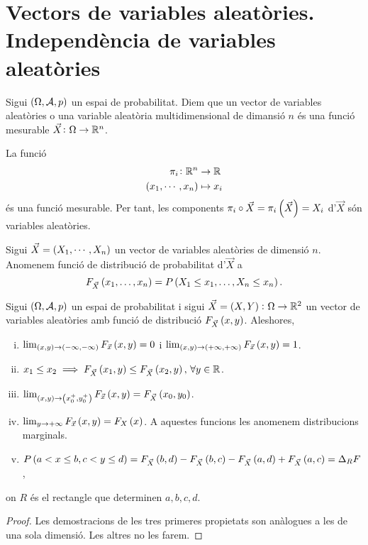 \section{Vectors de variables aleatòries. Independència de variables aleatòries}
\begin{defi}
    Sigui $\left(\Omega,\mathcal{A},p\right)$ un espai de probabilitat. Diem que un vector de variables aleatòries o una variable aleatòria multidimensional de dimansió $n$ és una funció mesurable $\vec{X}\colon\Omega\to\mathbb{R}^n$.
\end{defi}
\begin{obs}
    La funció 
    \begin{align*}
        \pi_i\colon\mathbb{R}^n &\to\mathbb{R}\\
        \left( x_1,\cdots,x_n\right) &\mapsto x_i
    \end{align*}
    és una funció mesurable. Per tant, les components $\pi_i\circ\vec{X}=\pi_i\left(\vec{X}\right)=X_i$ d'$\vec{X}$ són variables aleatòries.
\end{obs}
\begin{defi}
    Sigui $\vec{X}=\left( X_1,\cdots, X_n\right)$ un vector de variables aleatòries de dimensió $n$. Anomenem funció de distribució de probabilitat d'$\vec{X}$ a 
    \[
        F_{\vec{X}}\left( x_1,\dots,x_n\right) = P\left( X_1\leq x_1,\dots, X_n\leq x_n\right).
    \]
\end{defi}
\begin{prop}
    Sigui $\left(\Omega,\mathcal{A},p\right)$ un espai de probabilitat i sigui $\vec{X}=\left( X,Y\right)\colon\Omega\to\mathbb{R}^2$ un vector de variables aleatòries amb funció de distribució $F_{\vec{X}}\left( x,y\right)$. Aleshores,
    \begin{enumerate}[i)]
        \item $\lim_{\left( x,y \right)\to\left(-\infty,-\infty\right)}F_{\vec{x}}\left( x, y\right)=0$ i $\lim_{\left( x,y \right)\to\left(+\infty,+\infty\right)}F_{\vec{x}}\left( x, y\right)=1$.
        \item $x_1\leq x_2\implies F_{\vec{X}}\left( x_1,y\right)\leq F_{\vec{X}}\left( x_2,y\right),\,\forall y\in\mathbb{R}$.
        \item $\lim_{\left( x,y \right)\to\left( x_0^+,y_0^+\right)}F_{\vec{x}}\left( x, y\right)=F_{\vec{X}}\left( x_0,y_0\right)$.
        \item $\lim_{y\to+\infty}F_{\vec{x}}\left( x, y\right)=F_X\left( x\right)$. A aquestes funcions les anomenem distribucions marginals.
        \item $P\left( a<x\leq b, c<y\leq d\right)=F_{\vec{X}}\left( b,d\right)-F_{\vec{X}}\left( b,c\right)-F_{\vec{X}}\left( a,d\right)+F_{\vec{X}}\left( a,c\right)=\Delta_RF$,
    \end{enumerate}
    on $R$ és el rectangle que determinen $a, b, c, d$.
\end{prop}
\begin{proof}
    Les demostracions de les tres primeres propietats son anàlogues a les de una sola dimensió. Les altres no les farem.
\end{proof}

